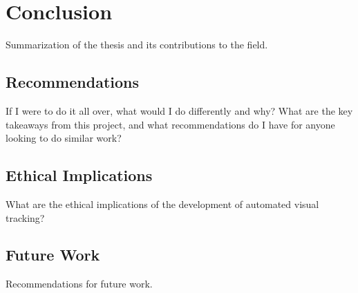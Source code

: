 \section{Conclusion}
Summarization of the thesis and its contributions to the field.

\subsection{Recommendations}
If I were to do it all over, what would I do differently and why? What are the key takeaways from this project, and what recommendations do I have for anyone looking to do similar work?

\subsection{Ethical Implications}
What are the ethical implications of the development of automated visual tracking?

\subsection{Future Work}
Recommendations for future work.